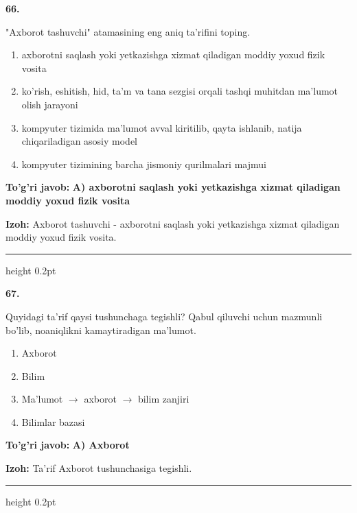 \documentclass[10pt,a4paper,oneside]{article}
\begin{document}
\noindent\textbf{\color{ink}66.}
\par
"Axborot tashuvchi" atamasining eng aniq ta'rifini toping.
\begin{enumerate}[label=\Alph*),leftmargin=9mm]
\item axborotni saqlash yoki yetkazishga xizmat qiladigan moddiy yoxud fizik vosita
\item ko'rish, eshitish, hid, ta'm va tana sezgisi orqali tashqi muhitdan ma'lumot olish jarayoni
\item kompyuter tizimida ma'lumot avval kiritilib, qayta ishlanib, natija chiqariladigan asosiy model
\item kompyuter tizimining barcha jismoniy qurilmalari majmui
\end{enumerate}
\begin{tcolorbox}[enhanced,breakable,colback=teal!4,colframe=teal!50!black,boxrule=0.5pt,arc=1.1mm,left=3mm,right=3mm,top=1.7mm,bottom=1.7mm,before skip=2mm,after skip=2mm]
\textbf{\color{teal}To'g'ri javob:} \textbf{A) axborotni saqlash yoki yetkazishga xizmat qiladigan moddiy yoxud fizik vosita}
\par\smallskip
\textbf{Izoh:} Axborot tashuvchi - axborotni saqlash yoki yetkazishga xizmat qiladigan moddiy yoxud fizik vosita.
\end{tcolorbox}
\vspace{2mm}\hrule height 0.2pt \vspace{3mm}

\noindent\textbf{\color{ink}67.}
\par
Quyidagi ta'rif qaysi tushunchaga tegishli? Qabul qiluvchi uchun mazmunli bo'lib, noaniqlikni kamaytiradigan ma'lumot.
\begin{enumerate}[label=\Alph*),leftmargin=9mm]
\item Axborot
\item Bilim
\item Ma'lumot \ensuremath{\to} axborot \ensuremath{\to} bilim zanjiri
\item Bilimlar bazasi
\end{enumerate}
\begin{tcolorbox}[enhanced,breakable,colback=teal!4,colframe=teal!50!black,boxrule=0.5pt,arc=1.1mm,left=3mm,right=3mm,top=1.7mm,bottom=1.7mm,before skip=2mm,after skip=2mm]
\textbf{\color{teal}To'g'ri javob:} \textbf{A) Axborot}
\par\smallskip
\textbf{Izoh:} Ta'rif Axborot tushunchasiga tegishli.
\end{tcolorbox}
\vspace{2mm}\hrule height 0.2pt \vspace{3mm}
\end{document}
